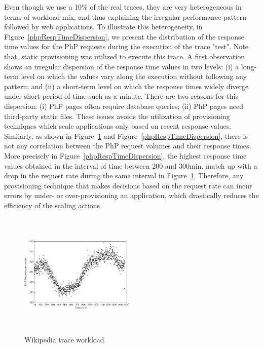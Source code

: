 Even though we use a 10\% of the real traces, they are very heterogeneous in terms of workload-mix, and thus explaining the irregular performance pattern followed by web applications. To illustrate this heterogeneity, in Figure~\ref{phpRespTimeDispersion}, we present the distribution of the response time values for the PhP requests during the execution of the trace "test". Note that, static provisioning was utilized to execute this trace. A first observation shows an irregular dispersion of the response time values in two levels: (i) a long-term level on which the values vary along the execution without following any pattern; and (ii) a short-term level on which the response times widely diverge under short period of time such as a minute. There are two reasons for this dispersion: (i) PhP pages often require database queries; (ii) PhP pages need third-party static files. These issues avoids the utilization of provisioning techniques which scale applications only based on recent response values. Similarly, as shown in Figure~\ref{workload} and Figure~\ref{phpRespTimeDispersion}, there is not any correlation between the PhP request volumes and their response times. More precisely in Figure~\ref{phpRespTimeDispersion}, the highest response time values obtained in the interval of time between 200 and 300min. match up with a drop in the request rate during the same interval in Figure~\ref{workload}. Therefore, any provisioning technique that makes decisions based on the request rate can incur errors by under- or over-provisioning an application, which drastically reduces the efficiency of the scaling actions. 





\begin{figure}
\begin{center}
\includegraphics[width=0.49\textwidth, height=6cm]{./images/traceWorkload}
\end{center}
\caption{Wikipedia trace workload}
\label{workload}
\end{figure}

